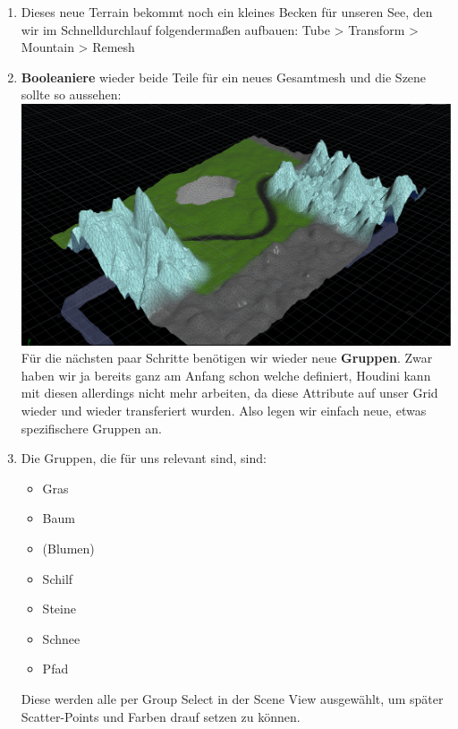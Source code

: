 \documentclass[paper=a4,fontsize=12pt,ngerman]{scrartcl}
\begin{document}
\begin{enumerate}
		\item Dieses neue Terrain bekommt noch ein kleines Becken für unseren See, den wir im Schnelldurchlauf folgendermaßen aufbauen: 
		Tube > Transform > Mountain > Remesh
		\item \textbf{Booleaniere} wieder beide Teile für ein neues Gesamtmesh und die Szene sollte so aussehen:\\
		\includegraphics*[width=\textwidth]{graphics/Nedim_See.png}\\
		Für die nächsten paar Schritte benötigen wir wieder neue \textbf{Gruppen}. Zwar haben wir ja bereits ganz  am Anfang schon welche definiert, Houdini kann mit diesen allerdings nicht mehr arbeiten, da diese Attribute auf unser Grid wieder und wieder transferiert wurden. Also legen wir einfach neue, etwas spezifischere Gruppen an.
		\item 
		\begin{minipage}{0.86\textwidth}
			Die Gruppen, die für uns relevant sind, sind:
		\begin{itemize}
			\item Gras
			\item Baum
			\item (Blumen)
			\item Schilf
			\item Steine
			\item Schnee
			\item Pfad
		\end{itemize}
		Diese werden alle per Group Select in der Scene View ausgewählt, um später Scatter-Points und Farben drauf setzen zu können.\\
		\end{minipage}
		\begin{minipage}{0.14\textwidth}

\end{minipage}
\end{enumerate}
\end{document}
